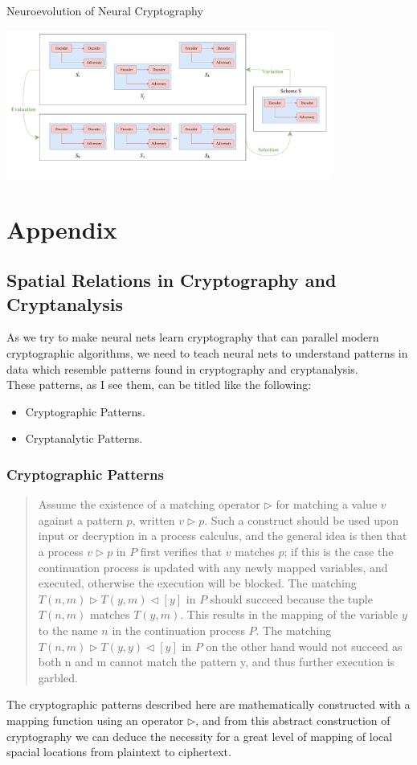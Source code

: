 \documentclass[a4paper, 12pt]{report}
\begin{document}
\begin{blockfigure}{Neuroevolution of Neural Cryptography}
	\begin{center}
		\includegraphics[width = 0.8\textwidth]{GAC}
	\end{center}
\end{blockfigure}
\newpage
\chapter*{Appendix}
\section*{\textbf{Spatial Relations in Cryptography and Cryptanalysis}}\label{appendix:1}
As we try to make neural nets learn cryptography that can parallel modern cryptographic algorithms, we need to teach neural nets to understand patterns in data which resemble patterns found in cryptography and cryptanalysis.\\
These patterns, as I see them, can be titled like the following:
\begin{itemize}
	\item Cryptographic Patterns.
	\item Cryptanalytic Patterns.
\end{itemize}
\subsection*{\textbf{Cryptographic Patterns}}
\blockquote{Assume the existence of a matching operator $ \rhd $ for matching a value
$ v $ against a pattern $ p $, written $ v \rhd p $. Such a construct should be used upon input or decryption in a process calculus, and the general idea is then that a process $ v \rhd p $ in $ P $ first verifies that $ v $ matches $ p $; if this is the case the continuation process is updated with any newly mapped variables, and executed, otherwise the execution will be blocked.
The matching $ T(n, m) \rhd T(y, m) \lhd [y] $ in $ P $ should succeed because the tuple $ T(n, m) $ matches $ T(y, m) $. This results in the mapping of the variable $ y $ to the name $ n $ in the continuation process $ P $. The matching $ T(n, m) \rhd T(y, y) \lhd [y] $ in $ P $ on the other hand would not succeed as both n and m cannot match the pattern y, and thus further execution is garbled.~\citep{Nielsen2007CryptographicPM}}
The cryptographic patterns described here are mathematically constructed with a mapping function using an operator $ \rhd $, and from this abstract construction of cryptography we can deduce the necessity for a great level of mapping of local spacial locations from plaintext to ciphertext.
\end{document}
